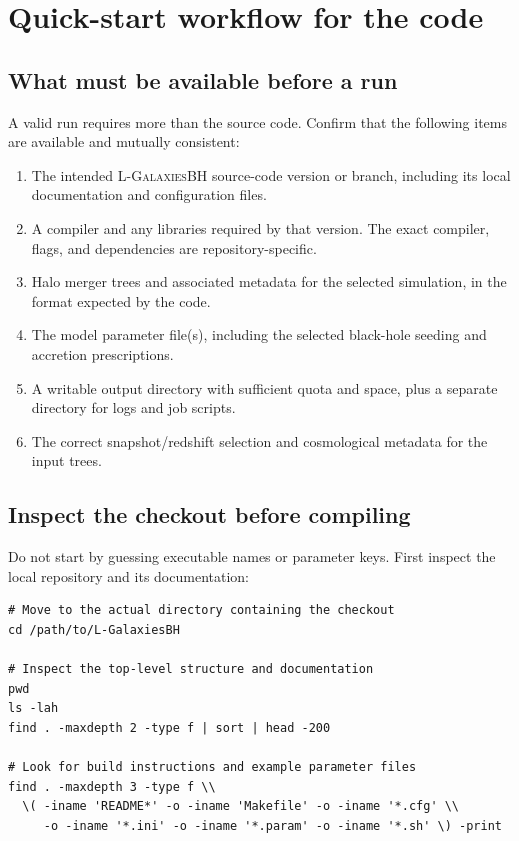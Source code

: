 \documentclass[11pt,a4paper]{article}
\newcommand{\Lgalbh}{\textsc{L-GalaxiesBH}}
\begin{document}

\newpage

\section{Quick-start workflow for the code}

\subsection{What must be available before a run}

A valid run requires more than the source code. Confirm that the following items are available and mutually consistent:
\begin{enumerate}
  \item The intended \Lgalbh{} source-code version or branch, including its local documentation and configuration files.
  \item A compiler and any libraries required by that version. The exact compiler, flags, and dependencies are repository-specific.
  \item Halo merger trees and associated metadata for the selected simulation, in the format expected by the code.
  \item The model parameter file(s), including the selected black-hole seeding and accretion prescriptions.
  \item A writable output directory with sufficient quota and space, plus a separate directory for logs and job scripts.
  \item The correct snapshot/redshift selection and cosmological metadata for the input trees.
\end{enumerate}

\subsection{Inspect the checkout before compiling}

Do not start by guessing executable names or parameter keys. First inspect the local repository and its documentation:
\begin{lstlisting}
# Move to the actual directory containing the checkout
cd /path/to/L-GalaxiesBH

# Inspect the top-level structure and documentation
pwd
ls -lah
find . -maxdepth 2 -type f | sort | head -200

# Look for build instructions and example parameter files
find . -maxdepth 3 -type f \\
  \( -iname 'README*' -o -iname 'Makefile' -o -iname '*.cfg' \\
     -o -iname '*.ini' -o -iname '*.param' -o -iname '*.sh' \) -print
\end{lstlisting}
\end{document}
